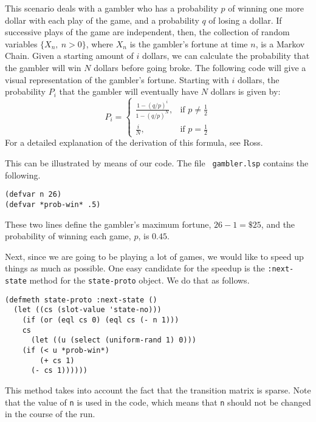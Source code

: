 This scenario deals with a gambler who has a probability $p$ of winning one 
more dollar with each play of the game, and a probability $q$ of losing a 
dollar.  If successive plays of the game are independent, then, the
collection of random variables $\{X_n,\ n>0\}$, where $X_n$ is the
gambler's fortune at time $n$, is a Markov Chain.
Given a starting amount of $i$ dollars, we can calculate the
probability that the gambler will win $N$ dollars before going broke.
The following code will give a visual representation of the gambler's
fortune.  Starting with $i$ dollars, the probability $P_{i}$ that the
gambler will eventually have $N$ dollars is given by: 
\[ P_{i}= \left\{
   \begin{array}{ll}
   \frac{1-(q/p)^{i}}{1-(q/p)^{N}}, & \mbox{if $p\not=\frac{1}{2}$} \\
   \frac{i}{N}, & \mbox{if $p=\frac{1}{2}$}
   \end{array}
\right. \]
For a detailed explanation of the derivation of this formula, see
Ross\cite{rosstext}.  

This can be illustrated by means of our code.  The file {\tt
  gambler.lsp} contains the following. 
\begin{verbatim}
(defvar n 26)
(defvar *prob-win* .5)
\end{verbatim}
These two lines define the gambler's maximum fortune, $26-1=\$25$, and
the probability of winning each game, $p$, is  $0.45$. 

Next, since we are going to be playing a lot of games, we would like
to speed up things as much as possible.  One easy candidate for the
speedup is the {\tt :next-state} method for the {\tt state-proto}
object. We do that as follows.
\begin{verbatim}
(defmeth state-proto :next-state ()
  (let ((cs (slot-value 'state-no)))
    (if (or (eql cs 0) (eql cs (- n 1)))
	cs
      (let ((u (select (uniform-rand 1) 0)))
	(if (< u *prob-win*)
	    (+ cs 1)
	  (- cs 1))))))
\end{verbatim}
This method takes into account the fact that the transition matrix is
sparse.  Note that the value of {\tt n} is used in the code, which means
that {\tt n} should not be changed in the course of the run. 


